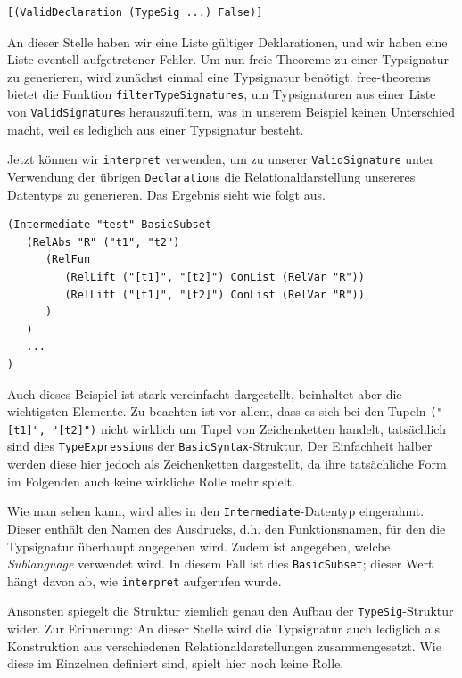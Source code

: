 \begin{verbatim}
[(ValidDeclaration (TypeSig ...) False)]
\end{verbatim}

An dieser Stelle haben wir eine Liste gültiger Deklarationen, und wir haben eine Liste eventell aufgetretener Fehler. Um nun
freie Theoreme zu einer Typsignatur zu generieren, wird zunächst einmal eine Typsignatur benötigt. free-theorems bietet die
Funktion \texttt{filterTypeSignatures}, um Typsignaturen aus einer Liste von \texttt{ValidSignature}s herauszufiltern, was in
unserem Beispiel keinen Unterschied macht, weil es lediglich aus einer Typsignatur besteht.

Jetzt können wir \texttt{interpret} verwenden, um zu unserer \texttt{ValidSignature} unter Verwendung der übrigen
\texttt{Declaration}s die Relationaldarstellung unsereres Datentyps zu generieren. Das Ergebnis sieht wie folgt aus.

\begin{verbatim}
(Intermediate "test" BasicSubset
   (RelAbs "R" ("t1", "t2")
      (RelFun
         (RelLift ("[t1]", "[t2]") ConList (RelVar "R"))
         (RelLift ("[t1]", "[t2]") ConList (RelVar "R"))
      )
   )
   ...
)
\end{verbatim}

Auch dieses Beispiel ist stark vereinfacht dargestellt, beinhaltet aber die wichtigsten Elemente. Zu beachten ist vor allem,
dass es sich bei den Tupeln \texttt{("[t1]", "[t2]")} nicht wirklich um Tupel von Zeichenketten handelt, tatsächlich sind dies
\texttt{TypeExpression}s der \texttt{BasicSyntax}-Struktur. Der Einfachheit halber werden diese hier jedoch als Zeichenketten
dargestellt, da ihre tatsächliche Form im Folgenden auch keine wirkliche Rolle mehr spielt.

Wie man sehen kann, wird alles in den \texttt{Intermediate}-Datentyp eingerahmt. Dieser enthält den Namen des Ausdrucks, d.h.
den Funktionsnamen, für den die Typsignatur überhaupt angegeben wird. Zudem ist angegeben, welche \textit{Sublanguage}
verwendet wird. In diesem Fall ist dies \texttt{BasicSubset}; dieser Wert hängt davon ab, wie \texttt{interpret} aufgerufen wurde.

Ansonsten spiegelt die Struktur ziemlich genau den Aufbau der \texttt{TypeSig}-Struktur wider. Zur Erinnerung: An dieser Stelle
wird die Typsignatur auch lediglich als Konstruktion aus verschiedenen Relationaldarstellungen zusammengesetzt. Wie diese
im Einzelnen definiert sind, spielt hier noch keine Rolle.

